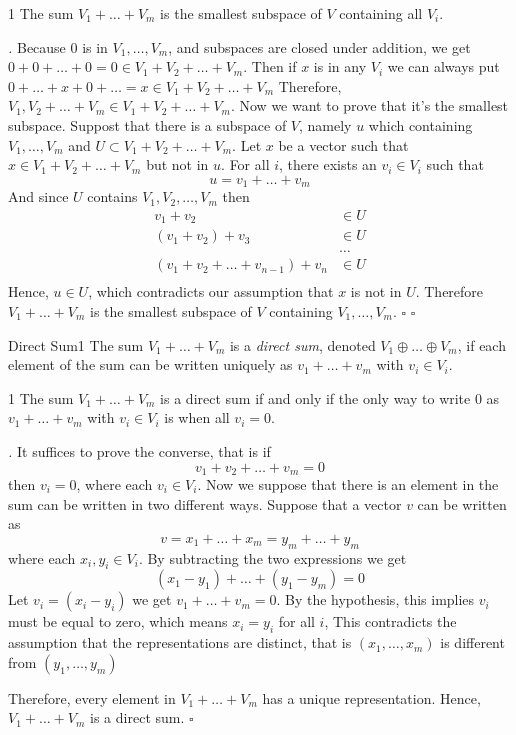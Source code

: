 \documentclass[11pt]{article}
\renewenvironment{proof}[1][\proofname]{\par\noindent\textit{#1.} }{\hfill$\square$\par}
\begin{document}
\begin{theorem}{}{1}
The sum $V_1 + \dots + V_m$ is the smallest subspace of $V$ containing all $V_i$.
\end{theorem}
\begin{proof}
 Because $0$ is in $V_1,\dots,V_m$, and subspaces are closed under addition, we get $0 + 0 +\dots + 0 = 0 \in V_1+V_2+\dots +V_m$. Then if $x$ is in any $V_i$ we can always put $0 + \dots + x + 0 + \dots = x \in V_1 + V_2 + \dots + V_m$
 Therefore, $V_1, V_2 + \dots + V_m \in V_1 + V_2 + \dots + V_m$. Now we want to prove that it's the smallest subspace. Suppost that there is a subspace of $V$, namely $u$ which containing $V_1,\dots,V_m$ and $U \subset V_1 + V_2 + \dots + V_m$. Let $x$ be a vector such that $x \in V_1 + V_2 + \dots + V_m$ but not in $u$. For all $i$, there exists an $v_i \in V_i$ such that
 $$
 	u = v_1 + \dots + v_m
 $$
 And since $U$ contains $V_1, V_2, \dots, V_m$ then
 $$
 	\begin{aligned}
 			v_1 + v_2 &\in U\\
 			(v_1 + v_2) + v_3 &\in U\\
 			&\dots\\
 			(v_1 + v_2 + \dots + v_{n - 1}) + v_n &\in U\\
 	\end{aligned}
 $$
Hence, $u \in U$, which contradicts our assumption that $x$ is not in $U$. Therefore $V_1 + \dots + V_m$ is the smallest subspace of $V$ containing $V_1, \dots, V_m$. $\square$ 
\end{proof}

\begin{definition}{Direct Sum}{1}
The sum $V_1 + \dots + V_m$ is a \textit{direct sum}, denoted $V_1 \oplus \dots \oplus V_m$, if each element of the sum can be written uniquely as $v_1 + \dots + v_m$ with $v_i \in V_i$.
\end{definition}

\begin{theorem}{}{1}
The sum $V_1 + \dots + V_m$ is a direct sum if and only if the only way to write $0$ as $v_1 + \dots + v_m$ with $v_i \in V_i$ is when all $v_i = 0$.
\end{theorem}
\begin{proof}
 It suffices to prove the converse, that is if 
 $$
 	v_1 + v_2 + \dots + v_m = 0
 $$
 then $v_i = 0$, where each $v_i \in V_i$. Now we suppose that there is an element in the sum can be written in two different ways. Suppose that a vector $v$ can be written as
 $$
 v = x_1 + \dots + x_m = y_m + \dots + y_m
 $$
 where each $x_i,y_i \in V_i$. By subtracting the two expressions we get
 $$
 	(x_1 - y_1) +\dots + (y_1 -y_m) = 0
 $$
 Let $v_i = (x_i - y_i)$ we get $v_1 + \dots + v_m = 0$. By the hypothesis, this implies $v_i$ must be equal to zero, which means $x_i = y_i$ for all $i$, This contradicts the assumption that the representations are distinct, that is $(x_1,\dots,x_m)$ is different from $(y_1,\dots,y_m)$
 
 Therefore, every element in $V_1 + \dots + V_m$ has a unique representation. Hence, $V_1 +\dots + V_m$ is a direct sum.
\end{proof}
\end{document}
